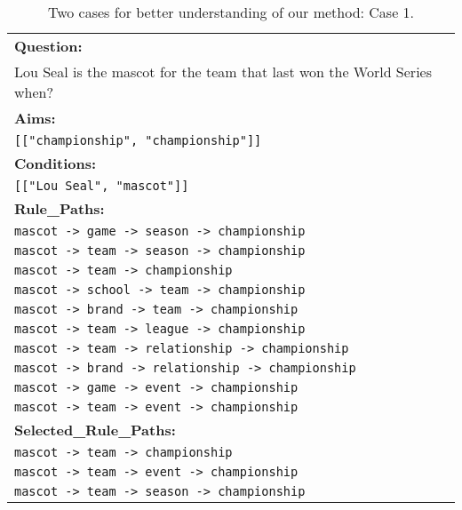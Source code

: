 \newpage
\begin{table}[htbp]
    \centering
    \caption{Two cases for better understanding of our method: Case 1.}
    \label{table:case1}
    \begin{tabular}{p{15cm}}
        \toprule
        \textbf{Question:} \\
        Lou Seal is the mascot for the team that last won the World Series when? \\
        \vspace{2mm} %
        \textbf{Aims:} \\
        \texttt{[["championship", "championship"]]} \\
        \vspace{2mm} %
        \textbf{Conditions:} \\
        \texttt{[["Lou Seal", "mascot"]]} \\
        \vspace{2mm} %
        \textbf{Rule\_Paths:} \\
        \texttt{mascot -> game -> season -> championship} \\
        \texttt{mascot -> team -> season -> championship} \\
        \texttt{mascot -> team -> championship} \\
        \texttt{mascot -> school -> team -> championship} \\
        \texttt{mascot -> brand -> team -> championship} \\
        \texttt{mascot -> team -> league -> championship} \\
        \texttt{mascot -> team -> relationship -> championship} \\
        \texttt{mascot -> brand -> relationship -> championship} \\
        \texttt{mascot -> game -> event -> championship} \\
        \texttt{mascot -> team -> event -> championship} \\
        \vspace{2mm} %
        \textbf{Selected\_Rule\_Paths:} \\
        \texttt{mascot -> team -> championship} \\
        \texttt{mascot -> team -> event -> championship} \\
        \texttt{mascot -> team -> season -> championship} \\

\end{tabular}
\end{table}
